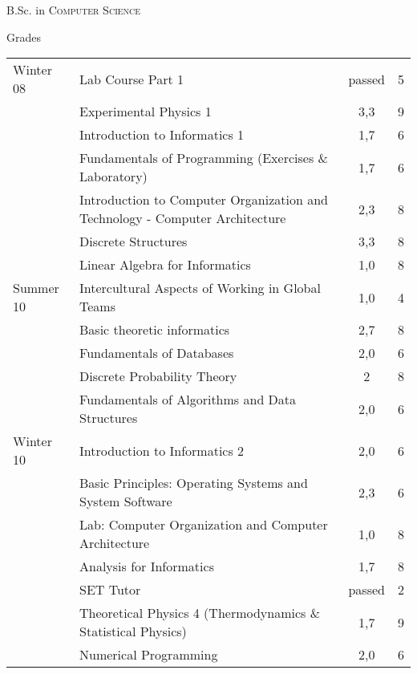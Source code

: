 \documentclass[a4paper,10pt]{article}
\begin{document}
\par{\centering\Large \hypertarget{grds_studies}{B.Sc. in \textsc{Computer Science}}\par} \large{\centering Grades\par}\normalsize
\begin{center}

\tabletail{
}
\tablelasttail{}

 \begin{supertabular}{p{2.5cm} p{7.3cm} c c}

Winter 08& Lab Course Part 1& passed & 5 \\ 
&Experimental Physics 1& 3,3 & 9\\
& Introduction to Informatics 1& 1,7& 6 \\
& Fundamentals of Programming (Exercises \& Laboratory)& 1,7& 6 \\
& Introduction to Computer Organization and Technology - Computer Architecture& 2,3& 8 \\
& Discrete Structures& 3,3& 8 \\
& Linear Algebra for Informatics& 1,0& 8 \\  \hline

Summer 10& Intercultural Aspects of Working in Global Teams & 1,0& 4 \\
& Basic theoretic informatics& 2,7& 8 \\
& Fundamentals of Databases& 2,0& 6 \\
& Discrete Probability Theory & 2 & 8 \\
& Fundamentals of Algorithms and Data Structures& 2,0 & 6 \\ \hline

Winter 10& Introduction to Informatics 2& 2,0 & 6 \\
& Basic Principles: Operating Systems and System Software& 2,3 & 6 \\
& Lab: Computer Organization and Computer Architecture& 1,0 & 8 \\
& Analysis for Informatics & 1,7 & 8 \\
& SET Tutor & passed & 2 \\
& Theoretical Physics 4 (Thermodynamics \& Statistical Physics) & 1,7 & 9 \\
& Numerical Programming & 2,0 & 6 \\ \hline


\end{supertabular}
\end{center}
\end{document}
